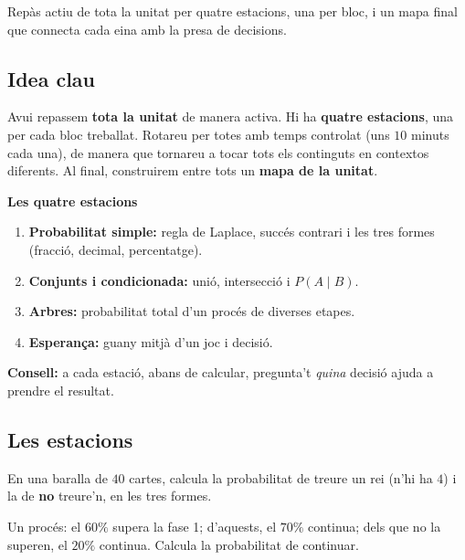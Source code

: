 %
{Repàs actiu de tota la unitat per quatre estacions, una per bloc, i un mapa final que connecta cada eina amb la presa de decisions.}

\subsection{Idea clau}

Avui repassem \textbf{tota la unitat} de manera activa. Hi ha \textbf{quatre estacions},
una per cada bloc treballat. Rotareu per totes amb temps controlat (uns $10$ minuts cada
una), de manera que tornareu a tocar tots els continguts en contextos diferents. Al
final, construirem entre tots un \textbf{mapa de la unitat}.

\begin{idea}
\textbf{Les quatre estacions}
\begin{enumerate}[leftmargin=1.6em, itemsep=2pt]
  \item \textbf{Probabilitat simple:} regla de Laplace, succés contrari i les tres
        formes (fracció, decimal, percentatge).
  \item \textbf{Conjunts i condicionada:} unió, intersecció i $P(A\mid B)$.
  \item \textbf{Arbres:} probabilitat total d'un procés de diverses etapes.
  \item \textbf{Esperança:} guany mitjà d'un joc i decisió.
\end{enumerate}
\textbf{Consell:} a cada estació, abans de calcular, pregunta't \emph{quina} decisió
ajuda a prendre el resultat.
\end{idea}

\subsection{Les estacions}

\begin{exemple}
En una baralla de $40$ cartes, calcula la probabilitat de treure un rei (n'hi ha $4$) i
la de \textbf{no} treure'n, en les tres formes.
\end{exemple}

\begin{exemple}
Un procés: el $60\%$ supera la fase 1; d'aquests, el $70\%$ continua; dels que no la
superen, el $20\%$ continua. Calcula la probabilitat de continuar.
\end{exemple}

